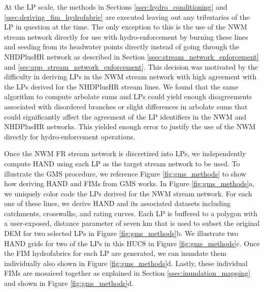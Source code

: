 \documentclass[draft]{dependencies/agujournal2019}
\begin{document}
At the LP scale, the methods in Sections \ref{ssec:hydro_conditioning} and \ref{ssec:deriving_fim_hydrofabric} are executed leaving out any tributaries of the LP in question at the time.
The only exception to this is the use of the NWM stream network directly for use with hydro-enforcement by burning these lines and seeding from its headwater points directly instead of going through the NHDPlusHR network as described in Section \ref{ssec:stream_network_enforcement} and \ref{sec:app_stream_network_enforcement}.
This decision was motivated by the difficulty in deriving LPs in the NWM stream network with high agreement with the LPs derived for the NHDPlusHR stream lines.
We found that the same algorithm to compute arbolate sums and LPs could yield enough disagreements associated with disordered branches or slight differences in arbolate sums that could significantly affect the agreement of the LP identifiers in the NWM and NHDPlusHR networks.
This yielded enough error to justify the use of the NWM directly for hydro-enforcement operations.

Once the NWM FR stream network is discretized into LPs, we independently compute HAND using each LP as the target stream network to be used.
To illustrate the GMS procedure, we reference Figure \ref{fig:gms_methods} to show how deriving HAND and FIMs from GMS works.
In Figure \ref{fig:gms_methods}a, we uniquely color code the LPs derived for the NWM stream network. 
For each one of these lines, we derive HAND and its associated datasets including catchments, crosswalks, and rating curves.
Each LP is buffered to a polygon with a user-exposed, distance parameter of seven km that is used to subset the original DEM for two selected LPs in Figure \ref{fig:gms_methods}b.
We illustrate two HAND grids for two of the LPs in this HUC8 in Figure \ref{fig:gms_methods}c.
Once the FIM hydrofabrics for each LP are generated, we can inundate them individually also shown in Figure \ref{fig:gms_methods}d.
Lastly, these individual FIMs are mosaiced together as explained in Section \ref{ssec:inundation_mapping} and shown in Figure \ref{fig:gms_methods}d.
\end{document}
